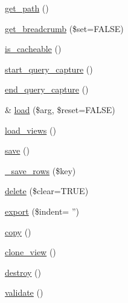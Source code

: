 \begin{CompactItemize}
\item 
\hyperlink{classview_2a43eaa103f3bb4c6677afbf8a94a549}{get\_\-path} ()
\item 
\hyperlink{classview_c8087bdc827dcf6f79630158f9941260}{get\_\-breadcrumb} (\$set=FALSE)
\item 
\hyperlink{classview_ca962e114d7d15eb16dd3b3616e5a96d}{is\_\-cacheable} ()
\item 
\hyperlink{classview_1e3efc171324e713e7e130c445dbf84d}{start\_\-query\_\-capture} ()
\item 
\hyperlink{classview_7170a33aff32de00b1ff92ee4483cb88}{end\_\-query\_\-capture} ()
\item 
\& \hyperlink{classview_ea9b1d4f59fb64b8007c2627ef0dc590}{load} (\$arg, \$reset=FALSE)
\item 
\hyperlink{classview_eddb81841a3933280dce642309b74840}{load\_\-views} ()
\item 
\hyperlink{classview_001430d43fd397235f63ad29fd269d53}{save} ()
\item 
\hyperlink{classview_c54578fd717de9be8c127add6e869bc2}{\_\-save\_\-rows} (\$key)
\item 
\hyperlink{classview_ded9b6fb90cc3107254f6a98f910649f}{delete} (\$clear=TRUE)
\item 
\hyperlink{classview_74dee74c2fbad9c0dc3450414d80216e}{export} (\$indent= '')
\item 
\hyperlink{classview_bc650102ccd583bd362f0e32fe091b99}{copy} ()
\item 
\hyperlink{classview_d9f19580a578b9e05c7f353090668a99}{clone\_\-view} ()
\item 
\hyperlink{classview_cbe0d04120a4fe96759d84f5287e154d}{destroy} ()
\item 
\hyperlink{classview_89950e757cb2da5094b1d413991fc353}{validate} ()
\end{CompactItemize}
